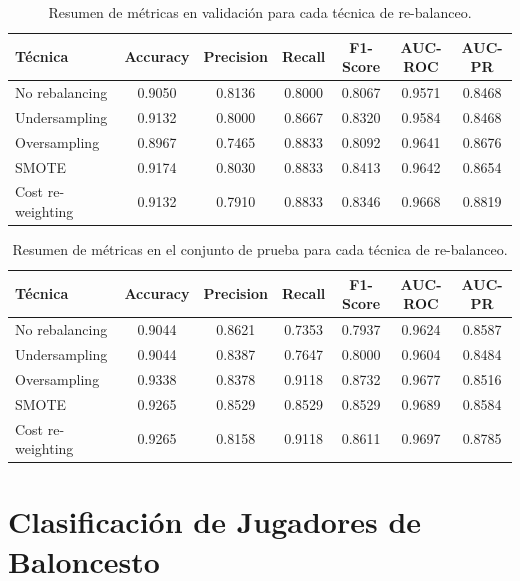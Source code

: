 \begin{table}[H]
\centering
\caption{Resumen de métricas en validación para cada técnica de re-balanceo.}
\label{tab:val-metrics-imbalanced}
\begin{tabular}{lcccccc}
\toprule
\textbf{Técnica} & \textbf{Accuracy} & \textbf{Precision} & \textbf{Recall} & \textbf{F1-Score} & \textbf{AUC-ROC} & \textbf{AUC-PR} \\
\midrule
No rebalancing           & 0.9050 & 0.8136 & 0.8000 & 0.8067 & 0.9571 & 0.8468 \\
Undersampling            & 0.9132 & 0.8000 & 0.8667 & 0.8320 & 0.9584 & 0.8468 \\
Oversampling             & 0.8967 & 0.7465 & 0.8833 & 0.8092 & 0.9641 & 0.8676 \\
SMOTE                    & 0.9174 & 0.8030 & 0.8833 & 0.8413 & 0.9642 & 0.8654 \\
Cost re-weighting        & 0.9132 & 0.7910 & 0.8833 & 0.8346 & 0.9668 & 0.8819 \\
\bottomrule
\end{tabular}
\end{table}

\begin{table}[H]
\centering
\caption{Resumen de métricas en el conjunto de prueba para cada técnica de re-balanceo.}
\label{tab:test-metrics-imbalanced}
\begin{tabular}{lcccccc}
\toprule
\textbf{Técnica} & \textbf{Accuracy} & \textbf{Precision} & \textbf{Recall} & \textbf{F1-Score} & \textbf{AUC-ROC} & \textbf{AUC-PR} \\
\midrule
No rebalancing           & 0.9044 & 0.8621 & 0.7353 & 0.7937 & 0.9624 & 0.8587 \\
Undersampling            & 0.9044 & 0.8387 & 0.7647 & 0.8000 & 0.9604 & 0.8484 \\
Oversampling             & 0.9338 & 0.8378 & 0.9118 & 0.8732 & 0.9677 & 0.8516 \\
SMOTE                    & 0.9265 & 0.8529 & 0.8529 & 0.8529 & 0.9689 & 0.8584 \\
Cost re-weighting        & 0.9265 & 0.8158 & 0.9118 & 0.8611 & 0.9697 & 0.8785 \\
\bottomrule
\end{tabular}
\end{table}




\section{Clasificación de Jugadores de Baloncesto}


